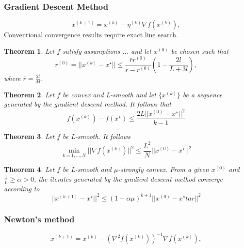 \documentclass[12pt]{article}
\newtheorem{theorem}{Theorem}[section]
\theoremstyle{definition}
\numberwithin{equation}{section}
\begin{document}
\subsubsection{Gradient Descent Method}
\begin{equation}  
  x^{(k+1)} = x^{(k)} - \eta^{(k)} \nabla f(x^{(k)}),
\end{equation}
Conventional convergence results require exact line search.

\cite{nesterov2003introductory}
\begin{theorem}
  Let $f$ satisfy assumptions ... and let $x^{(0)}$ be chosen such that 
  \begin{equation}
    r^{(0)} = ||x^{(k)} - x^\star|| \leq \frac{\bar{r}r^{(0)}}{\bar{r}-r^{(0)}}(1-\frac{2l}{L+3l}),
  \end{equation}
  where $\bar{r} = \frac{2l}{M}$.
\end{theorem}

\begin{theorem}
  Let $f$ be convex and L-smooth and let $\{x^{(k)}\}$ be a sequence generated by the gradient descent method. It follows that 
  \begin{equation}
    f(x^{(k)}) - f(x^\star) \leq \frac{2L||x^{(0)} - x^\star||^2}{k-1}
  \end{equation}
\end{theorem}

\begin{theorem}
  Let $f$ be L-smooth. It follows
  \begin{equation}
    \min_{k=1,\dots,N} ||\nabla f(x^{(k)})||^2 \leq \frac{L^2}{N}||x^{(0)}-x^\star||^2
  \end{equation}
\end{theorem}

\begin{theorem}
  Let $f$ be L-smooth and $\mu$-strongly convex. From a given $x^{(0)}$ and $\frac{1}{L} \geq \alpha > 0$, the iterates generated by the gradient descent method converge according to
  \begin{equation}
    ||x^{(k+1)} - x^\star ||^2 \leq (1-\alpha \mu)^{k+1}||x^{(0)} - x^star||^2
  \end{equation}
\end{theorem}
\subsubsection{Newton's method}
\begin{equation}
  x^{(k+1)} = x^{(k)} - (\nabla^2 f(x^{(k)}))^{-1}\nabla f(x^{(k)}),
\end{equation}
\end{document}
